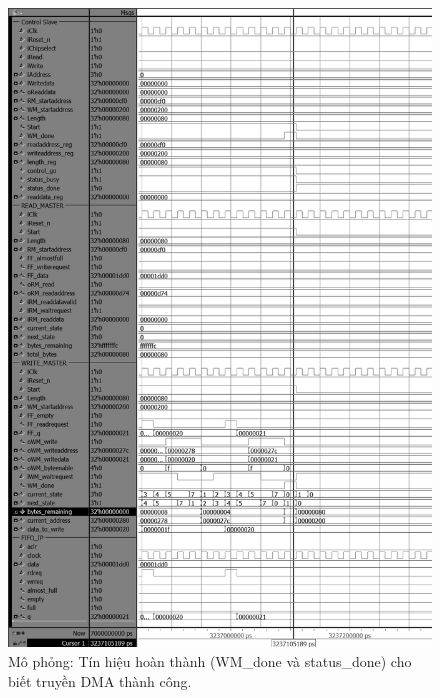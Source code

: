 \begin{figure}[htbp]
    \centering
    \includegraphics[width=\linewidth]{Images/04_06_DMA_Done.png}
    \caption{Mô phỏng: Tín hiệu hoàn thành (WM\_done và status\_done) cho biết truyền DMA thành công.}
    \label{fig:04_06_DMA_Done}
\end{figure}

